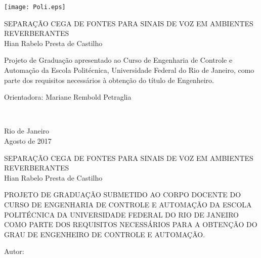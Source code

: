 \texttt{[image: Poli.eps]}

\begin{center} 									%
\large{SEPARAÇÃO CEGA DE FONTES PARA SINAIS DE VOZ EM AMBIENTES REVERBERANTES}\\                                   %
    \vspace{2cm}
\large{Hian Rabelo Presta de Castilho}\\		%
\end{center}									%

\vspace{2cm}									%
\hspace{7cm}									%

\hfill 
	\parbox{8.0cm}
	{Projeto de Graduação apresentado ao Curso de 
	 Engenharia de Controle e Automação da Escola 
	 Politécnica, Universidade Federal do Rio de 
	 Janeiro, como parte dos requisitos necessários 
	 à obtenção do título de Engenheiro.\\}
\vspace{2cm}


\hfill 
	\parbox{8.0cm}
	{Orientadora: Mariane Rembold Petraglia} \\

\vspace{2cm}

\begin{center}
Rio de Janeiro \\
Agosto de 2017
\end{center}

\pagebreak


\begin{center}
\large{SEPARAÇÃO CEGA DE FONTES PARA SINAIS DE VOZ EM AMBIENTES REVERBERANTES}\\
   \vspace{1cm}
\large{Hian Rabelo Presta de Castilho}\\
\end{center}
   \vspace{2cm}
PROJETO DE GRADUAÇÃO SUBMETIDO AO CORPO DOCENTE DO CURSO DE ENGENHARIA DE CONTROLE E AUTOMAÇÃO DA ESCOLA POLITÉCNICA DA UNIVERSIDADE FEDERAL DO RIO DE JANEIRO COMO PARTE DOS REQUISITOS NECESSÁRIOS PARA A OBTENÇÃO DO GRAU DE ENGENHEIRO DE CONTROLE E AUTOMAÇÃO.   
   
   \vspace{1cm}
Autor:
      \vspace{0.5cm}
      \begin{flushright}
         \parbox{10cm}{
            \hrulefill

            \vspace{-.375cm}
            \vspace{0.1cm}
         }
      \end{flushright}
      
